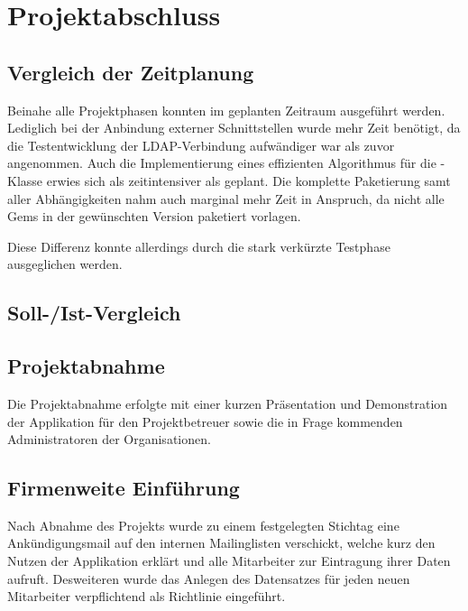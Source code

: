\section{Projektabschluss}
\label{sec:Projektabschluss}

\subsection{Vergleich der Zeitplanung}
\label{sec:Vergleich der Zeitplanung}

Beinahe alle Projektphasen konnten im geplanten Zeitraum ausgeführt werden. Lediglich bei
der Anbindung externer Schnittstellen wurde mehr Zeit benötigt, da die Testentwicklung der
\acs{LDAP}-Verbindung aufwändiger war als zuvor angenommen. Auch die Implementierung eines
effizienten Algorithmus für die -Klasse erwies sich als zeitintensiver als geplant.
Die komplette Paketierung samt aller Abhängigkeiten nahm auch marginal mehr Zeit in Anspruch, da
nicht alle Gems in der gewünschten Version paketiert vorlagen.

Diese Differenz konnte allerdings durch die stark verkürzte Testphase ausgeglichen werden.

\pagebreak

\subsection{Soll-/Ist-Vergleich}
\label{sec:SollIstVergleich}

\subsection{Projektabnahme}
\label{sec:Projektabnahme}
Die Projektabnahme erfolgte mit einer kurzen Präsentation und Demonstration der Applikation für den
Projektbetreuer sowie die in Frage kommenden Administratoren der Organisationen.

\subsection{Firmenweite Einführung}
\label{Firmenweite Einführung}
Nach Abnahme des Projekts wurde zu einem festgelegten Stichtag eine Ankündigungsmail auf den
internen Mailinglisten verschickt, welche kurz den Nutzen der Applikation erklärt und alle
Mitarbeiter zur Eintragung ihrer Daten aufruft. Desweiteren wurde das Anlegen des Datensatzes für
jeden neuen Mitarbeiter verpflichtend als Richtlinie eingeführt.
